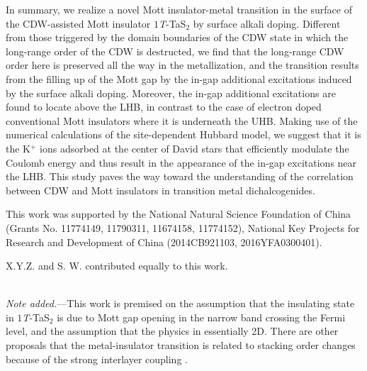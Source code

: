 \documentclass[aps,prl,reprint,groupedaddress,showpacs,amsfonts,amsmath,amssymb,superscriptaddress]{revtex4-1}
\begin{document}
In summary, we realize a novel Mott insulator-metal transition in the surface of the CDW-assisted Mott insulator $1$\emph{T}-TaS$_{2}$ by surface alkali doping. Different from those triggered by the domain boundaries of the CDW state in which the long-range order of the CDW is destructed, we find that the long-range CDW order here is preserved all the way in the metallization, and the transition results from the filling up of the Mott gap by the in-gap additional excitations induced by the surface alkali doping. Moreover, the in-gap additional excitations are found to locate above the LHB, in contrast to the case of electron doped conventional Mott insulators where it is underneath the UHB. Making use of the numerical calculations of the site-dependent Hubbard model, we suggest that it is the K$^{+}$ ions adsorbed at the center of David stars that efficiently modulate the Coulomb energy and thus result in the appearance of the in-gap excitations near the LHB. This study paves the way toward the understanding of the correlation between CDW and Mott insulators in transition metal dichalcogenides.

\begin{acknowledgments}
This work was supported by the National Natural Science Foundation of China (Grants No. 11774149, 11790311, 11674158, 11774152), National Key Projects for Research and Development of China (2014CB921103, 2016YFA0300401).

X.Y.Z. and S. W. contributed equally to this work.
\end{acknowledgments}

~\\
\noindent \emph{Note added.}---This work is premised on the assumption that the insulating state in $1$\emph{T}-TaS$_{2}$ is due to Mott gap opening in the narrow band crossing the Fermi level, and the assumption that the physics in essentially 2D. There are other proposals that the metal-insulator transition is related to stacking order changes because of the strong interlayer coupling \cite{PhysRevLett.122.106404}.


\end{document}
